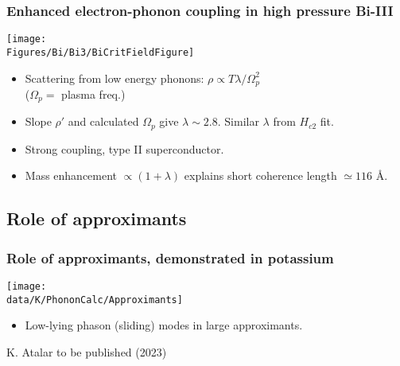 \begin{frame}[label=BiSuper2]
  \frametitle{Enhanced electron-phonon coupling in high pressure Bi-III}
  
  \centerline{\texttt{[image: \\Figures/Bi/Bi3/BiCritFieldFigure]}}
  
  \begin{itemize}
  \item Scattering from low energy phonons:
  $\rho \propto T \lambda/\Omega_p^2$\\
  ($\Omega_p = $ plasma freq.)
  
  \item Slope $\rho'$ and calculated $\Omega_p$ give
    $\lambda\sim 2.8$. Similar $\lambda$ from $H_{c2}$ fit.
  \item Strong coupling, type II superconductor. 
  \item Mass enhancement $\propto (1+\lambda)$
    explains short coherence length $\simeq 116$ \AA.
  \end{itemize}
  \end{frame}


\subsection{Role of approximants}
\begin{frame}
\frametitle{Role of approximants, demonstrated in potassium}

\centerline{\texttt{[image: \\data/K/PhononCalc/Approximants]}}

\begin{itemize}
\item
Low-lying phason (sliding) modes in large approximants.
\end{itemize}

\vspace*{\fill}
\centerline{\makebox[\linewidth]{\rule{0.85\textwidth}{0.4pt}}}
\centerline{\scriptsize K. Atalar to be published (2023)}

\end{frame}

